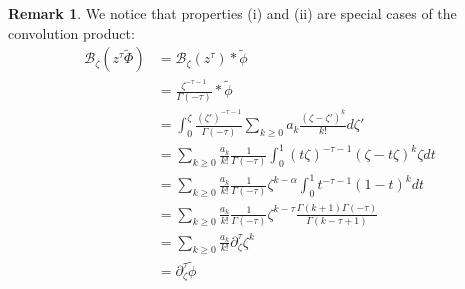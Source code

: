 \documentclass{article}
\theoremstyle{definition}
\newcommand{\borel}{\mathcal{B}}
\newtheorem{remark}[definition]{Remark}
\begin{document}
\begin{remark}
We notice that properties (i) and (ii) are special cases of the convolution product:
\begin{align*}
\borel_\zeta (z^\tau \tilde{\Phi})&=\borel_\zeta (z^\tau)\ast \tilde{\phi}\\
&=\frac{\zeta^{-\tau-1}}{\Gamma(-\tau)}\ast\tilde{\phi}\\
&=\int_0^\zeta \frac{(\zeta')^{-\tau-1}}{\Gamma(-\tau)}\sum_{k\geq 0}a_k\frac{(\zeta-\zeta')^k}{k!}d\zeta'\\
&=\sum_{k\geq 0}\frac{a_k}{k!}\frac{1}{\Gamma(-\tau)}\int_0^1(t\zeta)^{-\tau-1}(\zeta-t\zeta)^k\zeta dt\\
&=\sum_{k\geq 0}\frac{a_k}{k!}\frac{1}{\Gamma(-\tau)}\zeta^{k-\alpha}\int_0^1 t^{-\tau-1}(1-t)^k dt\\
&=\sum_{k\geq 0}\frac{a_k}{k!}\frac{1}{\Gamma(-\tau)}\zeta^{k-\tau}\frac{\Gamma(k+1)\Gamma(-\tau)}{\Gamma(k-\tau+1)}\\
&=\sum_{k\geq 0}\frac{a_k}{k!}\partial_\zeta^{\tau} \zeta^k \\
&=\partial_\zeta^\tau\tilde{\phi}
\end{align*}
\end{remark}
\end{document}
